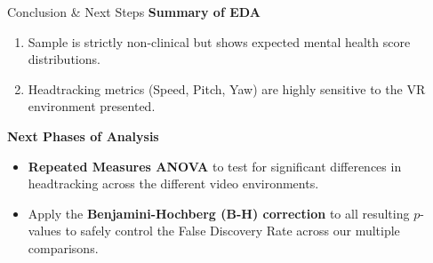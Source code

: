 \documentclass[aspectratio=169]{beamer}
\begin{document}
\begin{frame}{Conclusion \& Next Steps}
    \textbf{Summary of EDA}
    \begin{enumerate}
        \item Sample is strictly non-clinical but shows expected mental health score distributions.
        \item Headtracking metrics (Speed, Pitch, Yaw) are highly sensitive to the VR environment presented.
    \end{enumerate}

    \vspace{0.5cm}
    \textbf{Next Phases of Analysis}
    \begin{itemize}
        \item \textbf{Repeated Measures ANOVA} to test for significant differences in headtracking across the different video environments.
        \item Apply the \textbf{Benjamini-Hochberg (B-H) correction} to all resulting $p$-values to safely control the False Discovery Rate across our multiple comparisons.
    \end{itemize}
\end{frame}
\end{document}
